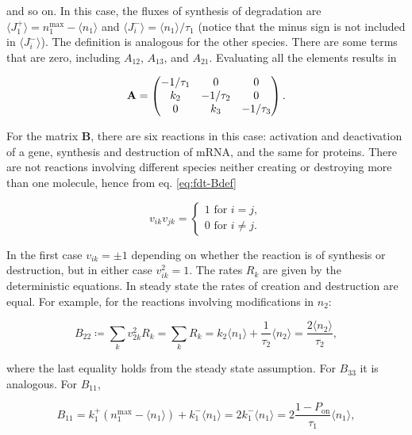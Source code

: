 and so on. In this case, the fluxes of synthesis of degradation are $\langle J_1^+\rangle = n_1^\text{max}-\langle n_1\rangle$ and $\langle J_i^-\rangle = \langle n_1\rangle/\tau_1$ (notice that the minus sign is not included in $\langle J_i^-\rangle$). The definition is analogous for the other species. There are some terms that are zero, including $A_{12}$, $A_{13}$, and $A_{21}$. Evaluating all the elements results in

\begin{equation}
  \label{eq:fdt-A}
  \mathbf{A} = \begin{pmatrix}
    -1/\tau_1 & 0 & 0 \\
    k_2 & -1/\tau_2 & 0 \\
    0 & k_3 & -1/\tau_3
  \end{pmatrix}.\\
\end{equation}

For the matrix $\mathbf{B}$, there are six reactions in this case: activation and deactivation of a gene, synthesis and destruction of mRNA, and the same for proteins. There are not reactions involving different species neither creating or destroying more than one molecule, hence from eq. \eqref{eq:fdt-Bdef}

\begin{equation*}
  v_{ik}v_{jk} = 
  \begin{cases}
    1 \text{ for } i = j,\\
    0 \text{ for } i\neq j.
  \end{cases}
\end{equation*}

In the first case $v_{ik} =\pm 1$ depending on whether the reaction is of synthesis or destruction, but in either case $v_{ik}^2 = 1$. The rates $R_k$ are given by the deterministic equations. In steady state the rates of creation and destruction are equal. For example, for the reactions involving modifications in $n_2$:

\begin{equation*}
  B_{22} \coloneqq \sum_kv_{2k}^2R_k = \sum_kR_k = k_2\langle n_1\rangle + \frac{1}{\tau_2}\langle n_2\rangle = \frac{2\langle n_2\rangle}{\tau_2},
\end{equation*}

where the last equality holds from the steady state assumption. For $B_{33}$ it is analogous. For $B_{11}$,

\begin{equation*}
  B_{11} = k_1^+(n_1^\text{max}-\langle n_1\rangle)+k_1^-\langle n_1\rangle = 2k_1^-\langle n_1\rangle = 2\frac{1-P_\text{on}}{\tau_1}\langle n_1\rangle,
\end{equation*}


